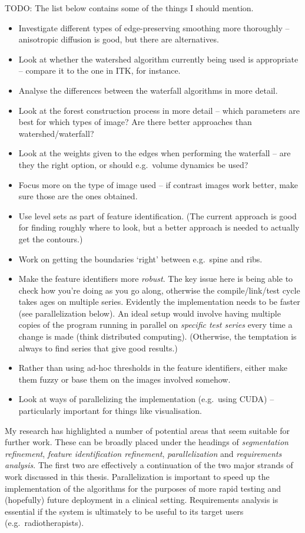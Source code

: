 TODO: The list below contains some of the things I should mention.
%
\begin{itemize}
\item Investigate different types of edge-preserving smoothing more thoroughly -- anisotropic diffusion is good, but there are alternatives.
\item Look at whether the watershed algorithm currently being used is appropriate -- compare it to the one in ITK, for instance.
\item Analyse the differences between the waterfall algorithms in more detail.
\item Look at the forest construction process in more detail -- which parameters are best for which types of image? Are there better approaches than watershed/waterfall?
\item Look at the weights given to the edges when performing the waterfall -- are they the right option, or should e.g.~volume dynamics be used?
\item Focus more on the type of image used -- if contrast images work better, make sure those are the ones obtained.
\item Use level sets as part of feature identification. (The current approach is good for finding roughly where to look, but a better approach is needed to actually get the contours.)
\item Work on getting the boundaries `right' between e.g.~spine and ribs.
\item Make the feature identifiers more \emph{robust}. The key issue here is being able to check how you're doing as you go along, otherwise the compile/link/test cycle takes ages on multiple series. Evidently the implementation needs to be faster (see parallelization below). An ideal setup would involve having multiple copies of the program running in parallel on \emph{specific test series} every time a change is made (think distributed computing). (Otherwise, the temptation is always to find series that give good results.)
\item Rather than using ad-hoc thresholds in the feature identifiers, either make them fuzzy or base them on the images involved somehow.
\item Look at ways of parallelizing the implementation (e.g.~using CUDA) -- particularly important for things like visualisation.
\end{itemize}

\fi

My research has highlighted a number of potential areas that seem suitable for further work. These can be broadly placed under the headings of \emph{segmentation refinement}, \emph{feature identification refinement}, \emph{parallelization} and \emph{requirements analysis}. The first two are effectively a continuation of the two major strands of work discussed in this thesis. Parallelization is important to speed up the implementation of the algorithms for the purposes of more rapid testing and (hopefully) future deployment in a clinical setting. Requirements analysis is essential if the system is ultimately to be useful to its target users (e.g.~radiotherapists).

